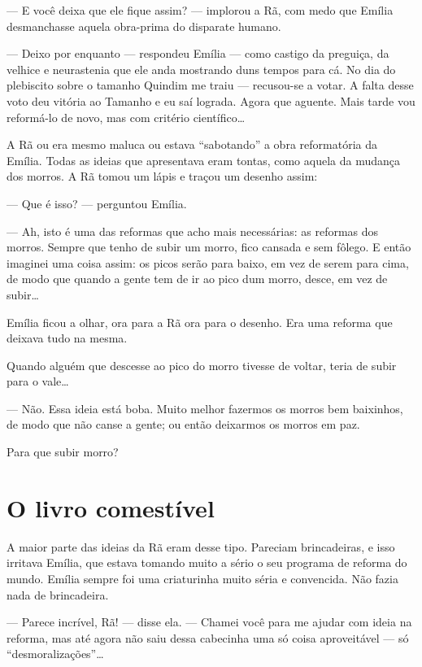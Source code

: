 --- E você deixa que ele fique assim? --- implorou a Rã, com medo que
Emília desmanchasse aquela obra-prima do disparate humano.

--- Deixo por enquanto --- respondeu Emília --- como castigo da
preguiça, da velhice e neurastenia que ele anda mostrando duns tempos
para cá. No dia do plebiscito sobre o tamanho Quindim me traiu ---
recusou-se a votar. A falta desse voto deu vitória ao Tamanho e eu saí
lograda. Agora que aguente. Mais tarde vou reformá-lo de novo, mas com
critério científico\ldots{}

A Rã ou era mesmo maluca ou estava ``sabotando'' a obra reformatória da
Emília. Todas as ideias que apresentava eram tontas, como aquela da
mudança dos morros. A Rã tomou um lápis e traçou um desenho assim:

--- Que é isso? --- perguntou Emília.

--- Ah, isto é uma das reformas que acho mais necessárias: as reformas
dos morros. Sempre que tenho de subir um morro, fico cansada e sem
fôlego. E então imaginei uma coisa assim: os picos serão para baixo, em
vez de serem para cima, de modo que quando a gente tem de ir ao pico dum
morro, desce, em vez de subir\ldots{}

Emília ficou a olhar, ora para a Rã ora para o desenho. Era uma reforma
que deixava tudo na mesma.

Quando alguém que descesse ao pico do morro tivesse de voltar, teria de
subir para o vale\ldots{}

--- Não. Essa ideia está boba. Muito melhor fazermos os morros bem
baixinhos, de modo que não canse a gente; ou então deixarmos os morros
em paz.

Para que subir morro?


\chapter{O livro comestível}

A maior parte das ideias da Rã eram desse tipo. Pareciam brincadeiras, e
isso irritava Emília, que estava tomando muito a sério o seu programa de
reforma do mundo. Emília sempre foi uma criaturinha muito séria e
convencida. Não fazia nada de brincadeira.

--- Parece incrível, Rã! --- disse ela. --- Chamei você para me ajudar
com ideia na reforma, mas até agora não saiu dessa cabecinha uma só
coisa aproveitável --- só ``desmoralizações''\ldots{}

